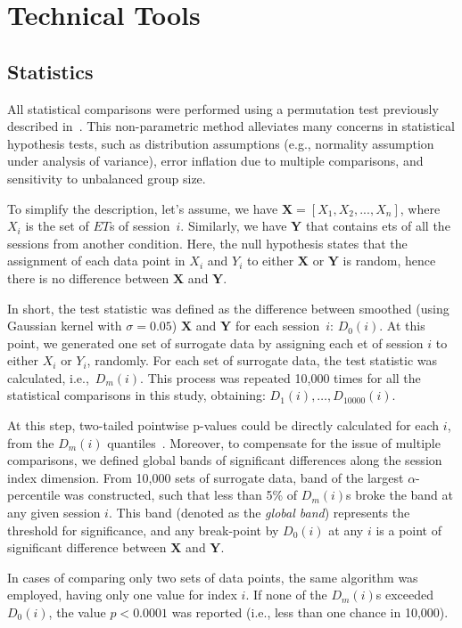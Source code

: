 \section{Technical Tools} \label{ch:methods:tech}

\subsection{Statistics}
All statistical comparisons were performed using a permutation test previously described in~\cite{Fujisawa2008NN}.
This non-parametric method alleviates many concerns in statistical hypothesis tests, such as distribution assumptions (e.g., normality assumption under analysis of variance), error inflation due to multiple comparisons, and sensitivity to unbalanced group size.
\par
To simplify the description, let's assume, we have ${\mathbf{X}=[X_1, X_2,...,X_n]}$, where $X_i$ is the set of $ET$s of session~$i$.
Similarly, we have $\mathbf{Y}$ that contains \glspl{et} of all the sessions from another condition.
Here, the null hypothesis states that the assignment of each data point in $X_i$ and $Y_i$ to either $\mathbf{X}$ or $\mathbf{Y}$ is random, hence there is no difference between $\mathbf{X}$ and $\mathbf{Y}$.
\par
In short, the test statistic was defined as the difference between smoothed (using Gaussian kernel with $\sigma =0.05$) $\mathbf{X}$ and $\mathbf{Y}$ for each session~$i$: $D_0(i)$.
At this point, we generated one set of surrogate data by assigning each \gls{et} of session $i$ to either $X_i$ or $Y_i$, randomly.
For each set of surrogate data, the test statistic was calculated, i.e.,~$D_m(i)$.
This process was repeated 10,000 times for all the statistical comparisons in this study, obtaining: $D_1(i),\ldots,D_{10000}(i)$.
\par
At this step, two-tailed pointwise p-values could be directly calculated for each $i$, from the $D_m(i)$ quantiles~\cite[see][]{Fujisawa2008NN}.
Moreover, to compensate for the issue of multiple comparisons, we defined global bands of significant differences along the session index dimension.
From 10,000 sets of surrogate data, band of the largest $\alpha$-percentile was constructed, such that less than 5\% of $D_m(i)$s broke the band at any given session $i$.
This band (denoted as the \textit{global band}) represents the threshold for significance, and any break-point by $D_0(i)$ at any $i$ is a point of significant difference between $\mathbf{X}$ and $\mathbf{Y}$.
\par
In cases of comparing only two sets of data points, the same algorithm was employed, having only one value for index $i$.
If none of the $D_m(i)$s exceeded $D_0(i)$, the value $p<0.0001$ was reported (i.e., less than one chance in 10,000).
